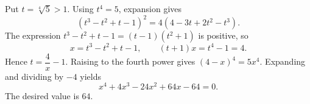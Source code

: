 Put $t=\sqrt[4]5>1$. Using $t^4=5$, expansion gives
\[
(t^3-t^2+t-1)^2=4(4-3t+2t^2-t^3).
\]
The expression $t^3-t^2+t-1=(t-1)(t^2+1)$ is positive, so
\[
x=t^3-t^2+t-1,\qquad (t+1)x=t^4-1=4.
\]
Hence $t=\dfrac{4}{x}-1$. Raising to the fourth power gives $(4-x)^4=5x^4$. Expanding and dividing by $-4$ yields
\[
x^4+4x^3-24x^2+64x-64=0.
\]
The desired value is $\boxed{64}$.
